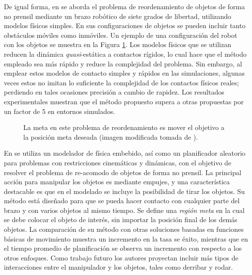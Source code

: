 De igual forma, en \cite{2018arXiv181010654P} se aborda el problema de reordenamiento de objetos de forma no prensil mediante un brazo robótico de siete grados de libertad, utilizando modelos físicos simples.
En sus configuraciones de objetos se pueden incluir tanto obstáculos móviles como inmóviles.
Un ejemplo de una configuración del robot con los objetos se muestra en la Figura \ref{fig:2018arXiv181010654P}.
Los modelos físicos que se utilizan reducen la dinámica \textit{quasi}-estática a contactos rígidos, lo cual hace que el método empleado sea más rápido y reduce la complejidad del problema.
Sin embargo, al emplear estos modelos de contacto simples y rápidos en las simulaciones, algunas veces estos no imitan lo suficiente la complejidad de los contactos físicos reales; perdiendo en tales ocasiones precisión a cambio de rapidez.
Los resultados experimentales muestran que el método propuesto supera a otras propuestas por un factor de 5 en entornos simulados.
%
\begin{figure}[H]
\caption{La meta en este problema de reordenamiento es mover el objetivo a la posición meta deseada (imagen modificada tomada de \cite{2018arXiv181010654P}).}%
\label{fig:2018arXiv181010654P}%
\end{figure}
%
En \cite{7139535} se utiliza un modelador de física embebido, así como un planificador aleatorio para problemas con restricciones cinemáticas y dinámicas, con el objetivo de resolver el problema de re-acomodo de objetos de forma no prensil. 
La principal acción para manipular los objetos es mediante empujes, y una característica destacable es que en el modelado se incluye la posibilidad de tirar los objetos.
Su método está diseñado para que se pueda hacer contacto con cualquier parte del brazo y con varios objetos al mismo tiempo. 
Se define una \textsl{región meta} en la cual se debe colocar el objeto de interés, sin importar la posición final de los demás objetos. 
La comparación de su método con otras soluciones basadas en funciones básicas de movimiento muestra un incremento en la tasa se éxito, mientras que en el tiempo promedio de planificación se observa un incremento con respecto a los otros enfoques.
Como trabajo futuro los autores proyectan incluir más tipos de interacciones entre el manipulador y los objetos, tales como derribar y rodar.

